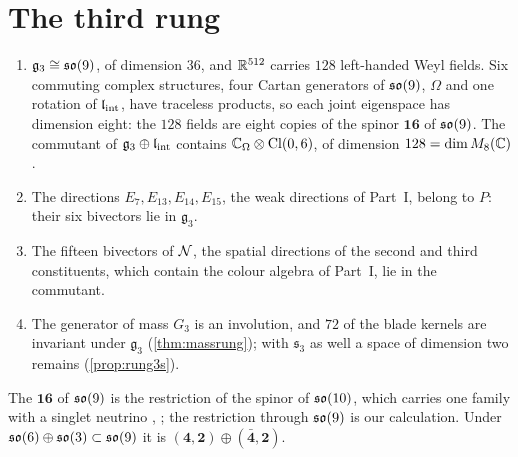 \section{The third rung}

\begin{theorem}
\label{thm:rung3}
\begin{enumerate}[label=(\roman*),leftmargin=2.2em,itemsep=1pt]
\item $\mathfrak g_3\cong\mathfrak{so}(9)$, of dimension $36$, and $\mathbb{R}^{512}$ carries $128$ left-handed Weyl fields. Six commuting complex structures,
four Cartan generators of $\mathfrak{so}(9)$, $\Omega$ and one rotation of $\mathfrak l_{\rm int}$, have traceless products, so each joint eigenspace has dimension
eight: the $128$ fields are eight copies of the spinor $\mathbf{16}$ of $\mathfrak{so}(9)$. The commutant of $\mathfrak g_3\oplus\mathfrak l_{\rm int}$ contains
$\mathbb{C}_\Omega\otimes\mathrm{Cl}(0,6)$, of dimension $128=\dim M_8(\mathbb{C})$.
\item The directions $E_7,E_{13},E_{14},E_{15}$, the weak directions of Part~I, belong to $P$: their six bivectors lie in $\mathfrak g_3$.
\item The fifteen bivectors of $\mathcal N$, the spatial directions of the second and third constituents, which contain the colour algebra of
Part~I, lie in the commutant.
\item The generator of mass $G_3$ is an involution, and $72$ of the blade kernels are invariant under $\mathfrak g_3$
(\cref{thm:massrung}); with $\mathfrak s_3$ as well a space of dimension two remains (\cref{prop:rung3s}).
\end{enumerate}
\end{theorem}

The $\mathbf{16}$ of $\mathfrak{so}(9)$ is the restriction of the spinor of $\mathfrak{so}(10)$, which carries one family with a singlet neutrino
\cite{FritzschMinkowski}, \cite[\S93.2.3]{PDGGUT}; the restriction through $\mathfrak{so}(9)$ is our calculation. Under
$\mathfrak{so}(6)\oplus\mathfrak{so}(3)\subset\mathfrak{so}(9)$ it is $(\mathbf4,\mathbf2)\oplus(\bar{\mathbf4},\mathbf2)$.

